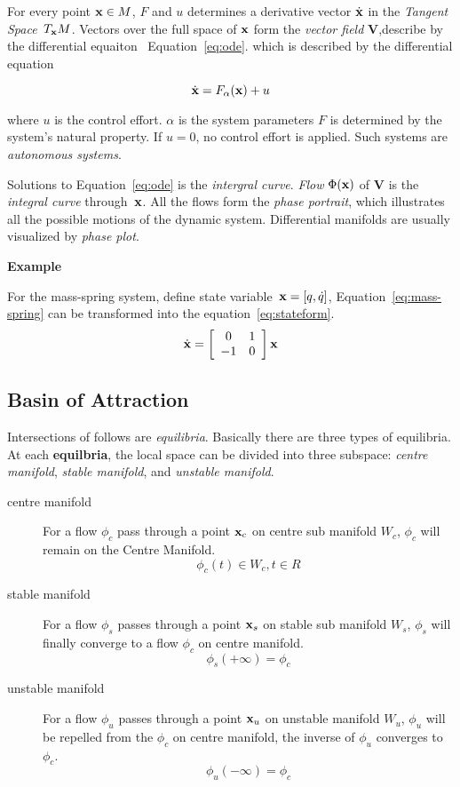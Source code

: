 For every point $\mathbf{x} \in M$, 
$F$ and $u$ determines a derivative vector $\dot{\mathbf{x}}$ in the \emph{Tangent Space}~$T_{\mathbf{x}}M$. 
Vectors over the full space of $\mathbf{x}$ form the \emph{vector field} $\mathbf{V}$,describe by the differential equaiton~ Equation~\ref{eq:ode}.
which is described by the differential equation

\begin{equation}
\label{eq:ode}
\dot{\mathbf{x}}=F_{\alpha}(\mathbf{x})+u
\end{equation}



where $u$ is the control effort. 
$\alpha$ is the system parameters
$F$ is determined by the system's natural property.
If $u=0$,  no control effort is applied.
Such systems are \emph{autonomous systems}. 

Solutions to Equation~\ref{eq:ode} is the \emph{intergral curve}. 
\emph{Flow} $\Phi(\mathbf{x})$ of $\mathbf{V}$ is the \emph{integral curve} through~$\mathbf{x}$. 
All the flows form the \emph{phase portrait}, which illustrates all the possible motions of the dynamic system.
Differential manifolds are usually visualized by \emph{phase plot}.

\textbf{Example}

For the mass-spring system, define state variable~$\mathbf{x}=[q,\dot{q}]$, Equation~\ref{eq:mass-spring} can be transformed into the equation~\ref{eq:stateform}.
\begin{equation}
\label{eq:stateform}
\dot{\mathbf{x}}=
\left[ 
\begin{array}{cc}
0 &1\\
-1 &0 
\end{array}
\right]\mathbf{x}
\end{equation}



\subsection{Basin of Attraction}
Intersections of follows are \emph{equilibria}.
Basically there are three types of equilibria.
At each \textbf{equilbria}, the local space can be divided into three subspace: 
\emph{centre manifold}, \emph{stable manifold}, and \emph{unstable manifold}.
\begin{description} 
\item[centre manifold]
For a flow $\phi_c$ pass through a point $\mathbf{x}_{c}$ on centre sub manifold $W_{c}$, $\phi_c$ will remain on the Centre Manifold. 
\[
\phi_{c}(t) \in W_{c}, t \in R
\]

\item [stable manifold]
For a flow $\phi_{s}$ passes through a point $\mathbf{x}_{s}$ on stable sub manifold $W_{s}$, $\phi_s$ will finally converge to a flow $\phi_c$ on centre manifold.
\[
\phi_{s}(+\infty)=\phi_{c}
\]
\item[unstable manifold]
For a flow $\phi_u$ passes through a point $\mathbf{x}_u$ on unstable manifold $W_{u}$, $\phi_u$ will be repelled from the $\phi_c$ on centre manifold, the inverse of $\phi_u$ converges to $\phi_c$. 
\[
\phi_{u}(-\infty)=\phi_{c}
\] 
\end{description}


